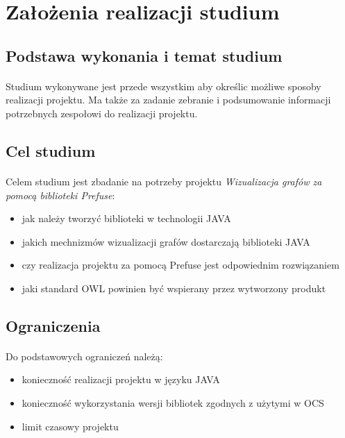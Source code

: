 \documentclass[a4paper,10pt]{article}
\begin{document}
\section{Założenia realizacji studium}

\subsection{Podstawa wykonania i temat studium}
\paragraph{} Studium wykonywane jest przede wszystkim aby określic możliwe sposoby realizacji projektu. Ma także za zadanie zebranie i podsumowanie informacji potrzebnych zespołowi do realizacji projektu. 

\subsection{Cel studium}
\paragraph{} Celem studium jest zbadanie na potrzeby projektu \textit{Wizualizacja grafów za pomocą biblioteki Prefuse}: 
\begin{itemize}
 	\item jak należy tworzyć biblioteki w technologii JAVA
 	\item jakich mechnizmów wizualizacji grafów dostarczają biblioteki JAVA 
	\item czy realizacja projektu za pomocą Prefuse jest odpowiednim rozwiązaniem
	\item jaki standard OWL powinien być wspierany przez wytworzony produkt
\end{itemize}

\subsection{Ograniczenia}
\paragraph{} Do podstawowych ograniczeń należą:
\begin{itemize}
 	\item konieczność realizacji projektu w języku JAVA
	\item konieczność wykorzystania wersji bibliotek zgodnych z użytymi w OCS
	\item limit czasowy projektu 
\end{itemize}
\end{document}

